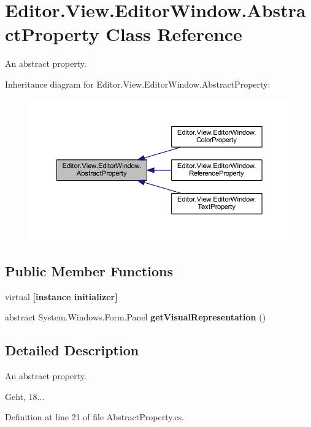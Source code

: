 \section{Editor.\-View.\-Editor\-Window.\-Abstract\-Property Class Reference}
\label{class_editor_1_1_view_1_1_editor_window_1_1_abstract_property}


An abstract property.  




Inheritance diagram for Editor.\-View.\-Editor\-Window.\-Abstract\-Property\-:
\nopagebreak
\begin{figure}[H]
\begin{center}
\leavevmode
\includegraphics[width=350pt]{class_editor_1_1_view_1_1_editor_window_1_1_abstract_property__inherit__graph}
\end{center}
\end{figure}
\subsection*{Public Member Functions}
\begin{DoxyCompactItemize}
\item 
virtual {\bfseries [instance initializer]}\label{class_editor_1_1_view_1_1_editor_window_1_1_abstract_property_a0b12f79ee5b1fb7d34454a7788dce90f}

\item 
abstract System.\-Windows.\-Form.\-Panel {\bfseries get\-Visual\-Representation} ()\label{class_editor_1_1_view_1_1_editor_window_1_1_abstract_property_a9c5fd1dffa544ba83c6b194a6bd2aedd}

\end{DoxyCompactItemize}


\subsection{Detailed Description}
An abstract property. 

Geht, 18... 

Definition at line 21 of file Abstract\-Property.\-cs.

